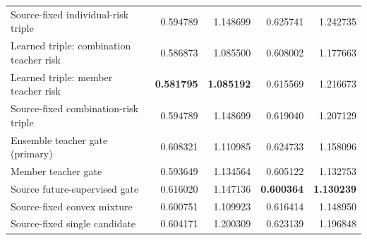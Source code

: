 \begin{table}[!htbp]
\begin{tabular}{lrrrr}
Source-fixed individual-risk triple & 0.594789 & 1.148699 & 0.625741 & 1.242735\\
Learned triple: combination teacher risk & 0.586873 & 1.085500 & 0.608002 & 1.177663\\
Learned triple: member teacher risk & \textbf{0.581795} & \textbf{1.085192} & 0.615569 & 1.216673\\
Source-fixed combination-risk triple & 0.594789 & 1.148699 & 0.619040 & 1.207129\\
Ensemble teacher gate (primary) & 0.608321 & 1.110985 & 0.624733 & 1.158096\\
Member teacher gate & 0.593649 & 1.134564 & 0.605122 & 1.132753\\
Source future-supervised gate & 0.616020 & 1.147136 & \textbf{0.600364} & \textbf{1.130239}\\
Source-fixed convex mixture & 0.600751 & 1.109923 & 0.616414 & 1.148950\\
Source-fixed single candidate & 0.604171 & 1.200309 & 0.623139 & 1.196848\\
\bottomrule
\end{tabular}
\end{table}


